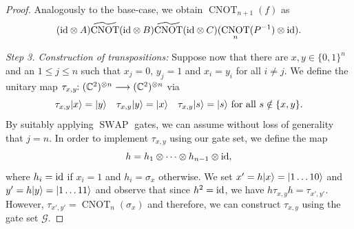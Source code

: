 \documentclass[a4paper, oneside, 12pt]{amsart}
\DeclareMathOperator{\SWAP}{SWAP}
\DeclareMathOperator{\CNOT}{CNOT}
\begin{document}
\begin{proof}
  Analogously to the base-case, we obtain \(\CNOT_{{n+1}}(f)\) as
  \begin{equation*}
    (\id\otimes A)\widetilde{\CNOT}(\id\otimes B)\widetilde{\CNOT}(\id\otimes C)(\CNOT_{n}(P^{-1})\otimes\id).
  \end{equation*}

  \noindent
  \textit{Step 3. Construction of transpositions:}
  Suppose now that there are \(x,y \in\{0,1\}^{n}\) and an \(1\leq j \leq n\) such that \(x_{j}=0\), \(y_{j}=1\) and \(x_{i}=y_{i}\) for all \(i \neq j\).
  We define the unitary map \(\tau_{x,y} \from ( \mathbb{C}^{2})^{\otimes n} \to ( \mathbb{C}^{2})^{\otimes n}\) via
  \begin{equation*}
    \tau_{x,y} \lvert x\rangle = \lvert y\rangle \quad
    \tau_{x,y} \lvert y\rangle = \lvert x\rangle \quad
    \tau_{x,y}\lvert s\rangle = \lvert s\rangle \text{ for all } s\notin\{x,y\}.
  \end{equation*}
  By suitably applying \(\SWAP\) gates, we can assume without loss of generality that \(j=n\).
  In order to implement \(\tau_{x,y}\) using our gate set, we define the map
  \begin{equation*}
    h= h_{1} \otimes \dots \otimes  h_{n-1}\otimes \mathrm{id},
  \end{equation*}
  where \( h_i = \mathrm{id} \) if \( x_i = 1 \) and \( h_i = \sigma_x \) otherwise.
  We set \(x' =h \lvert x\rangle = \lvert1\dots1 0\rangle \) and \(y'= h\lvert y\rangle= \lvert1 \dots 1 1\rangle\) and observe that since \(h^{2}=\mathrm{id}\), we have
  \(h\tau_{x,y}h= \tau_{x',y'}\).
  However, \(\tau_{x', y'} = \CNOT_{n}(\sigma_{x})\) and therefore, we can construct \(\tau_{x,y}\) using the gate set \(\mathcal{G}\).
  \medskip


\end{proof}
\end{document}
